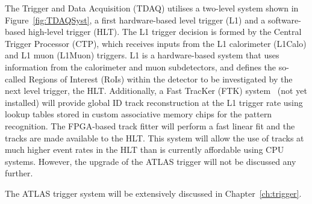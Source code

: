 		The Trigger and Data Acquisition (TDAQ) utilises a two-level system shown in Figure~\ref{fig:TDAQSyst}, a first hardware-based level trigger (L1) and a software-based high-level trigger (HLT). The L1 trigger decision is formed by the Central Trigger Processor (CTP), which receives inputs from the L1 calorimeter (L1Calo) and L1 muon (L1Muon) triggers. L1 is a hardware-based system that uses information from the calorimeter and muon subdetectors, and defines the so-called Regions of Interest (RoIs) within the detector to be investigated by the next level trigger, the HLT. Additionally, a Fast TracKer (FTK) system~\cite{FTKTDR} (not yet installed) will provide global ID track reconstruction at the L1 trigger rate using lookup tables stored in custom associative memory chips for the pattern recognition. The FPGA-based track fitter will perform a fast linear fit and the tracks are made available to the HLT. This system will allow the use of tracks at much higher event rates in the HLT than is currently affordable using CPU systems. However, the upgrade of the ATLAS trigger will not be discussed any further.

		The ATLAS trigger system will be extensively discussed in Chapter~\ref{ch:trigger}.